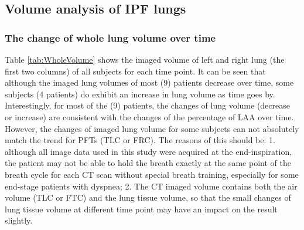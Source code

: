 \subsection{Volume analysis of IPF lungs} \label{VolumeAnalysis}
\subsubsection{The change of whole lung volume over time}
Table \ref{tab:WholeVolume} shows the imaged volume of left and right lung (the first two columns) of all subjects for each time point. It can be seen that although the imaged lung volumes of most (9) patients decrease over time, some subjects (4 patients) do exhibit an increase in lung volume as time goes by. Interestingly, for most of the (9) patients, the changes of lung volume (decrease or increase) are consistent with the changes of the percentage of LAA over time. However, the changes of imaged lung volume for some subjects can not absolutely match the trend for PFTs (TLC or FRC). The reasons of this should be: 1. although all image data used in this study were acquired at the end-inspiration, the patient may not be able to hold the breath exactly at the same point of the breath cycle for each CT scan without special breath training, especially for some end-stage patients with dyspnea; 2. The CT imaged volume contains both the air volume (TLC or FTC) and the lung tissue volume, so that the small changes of lung tissue volume at different time point may have an impact on the result slightly.

